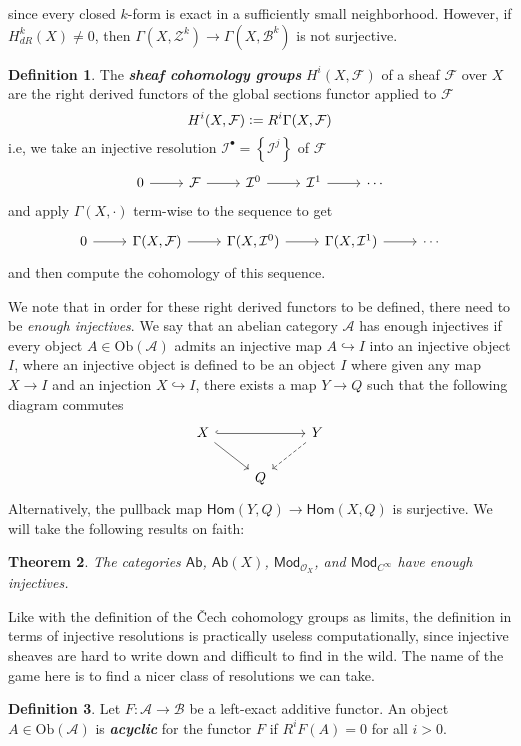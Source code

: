 \documentclass[psamsfonts, 12pt]{amsart}
\newtheorem{thm}{Theorem}[section]
\theoremstyle{definition}
\newtheorem{defn}[thm]{Definition}
\theoremstyle{remark}
\renewcommand{\hom}{\mathsf{Hom}}
\renewcommand{\O}{\mathcal{O}}
\newcommand{\ib}[1]{\textbf{\textit{#1}}}
\newcommand{\set}[1]{\left\lbrace #1 \right\rbrace}
\newcommand{\defeq}{\vcentcolon=}
\begin{document}
since every closed $k$-form is exact in a sufficiently small neighborhood. However,
if $H^k_{dR}(X) \neq 0$, then $\Gamma(X,\mathcal{Z}^k) \to \Gamma(X, \mathcal{B}^k)$
is not surjective.
%
\begin{defn}
The \ib{sheaf cohomology groups} $H^i(X, \mathcal{F})$ of a sheaf $\mathcal{F}$ over $X$
are the right derived functors of the global sections functor applied to $\mathcal{F}$
\[
H^i(X,\mathcal{F}) \defeq R^i\Gamma(X,\mathcal{F})
\]
i.e, we take an injective resolution $\mathcal{I}^\bullet = \set{\mathcal{I}^j}$ of
$\mathcal{F}$
\[\begin{tikzcd}
0 \ar[r] & \mathcal{F} \ar[r] & \mathcal{I}^0 \ar[r] & \mathcal{I}^1 \ar[r] & \cdots
\end{tikzcd}\]
and apply $\Gamma(X,\cdot)$ term-wise to the sequence to get
\[\begin{tikzcd}
0 \ar[r] & \Gamma(X,\mathcal{F}) \ar[r] & \Gamma(X,\mathcal{I}^0) \ar[r]
& \Gamma(X,\mathcal{I}^1) \ar[r] & \cdots
\end{tikzcd}\]
and then compute the cohomology of this sequence.
\end{defn}
%
We note that in order for these right derived functors to be defined, there need to
be \emph{enough injectives}. We say that an abelian category $\mathcal{A}$ has enough
injectives if every object $A \in \mathrm{Ob}(\mathcal{A})$ admits an injective
map $A \hookrightarrow I$ into an injective object $I$, where an injective object
is defined to be an object $I$ where given any map $X \to I$ and an injection
$X \hookrightarrow I$, there exists a map $Y \to Q$ such that the following diagram
commutes
\[\begin{tikzcd}
X \ar[dr]\ar[rr,hookrightarrow] & & Y \ar[dl, dashed] \\
& Q
\end{tikzcd}\]
Alternatively, the pullback map $\hom(Y,Q) \to \hom(X,Q)$ is surjective. We will take
the following results on faith:
%
\begin{thm}
The categories $\mathsf{Ab}$, $\mathsf{Ab}(X)$, $\mathsf{Mod}_{\O_X}$,
and $\mathsf{Mod}_{C^\infty}$ have
enough injectives.
\end{thm}
%
Like with the definition of the \v{C}ech cohomology groups as limits, the
definition in terms of injective resolutions is practically useless computationally,
since injective sheaves are hard to write down and difficult to find in the wild.
The name of the game here is to find a nicer class of resolutions we can take.
%
\begin{defn}
Let $F : \mathcal{A} \to \mathcal{B}$ be a left-exact additive functor. An object
$A \in \mathrm{Ob}(\mathcal{A})$ is \ib{acyclic} for the functor $F$ if
$R^iF(A) = 0$ for all $i > 0$.
\end{defn}
\end{document}
